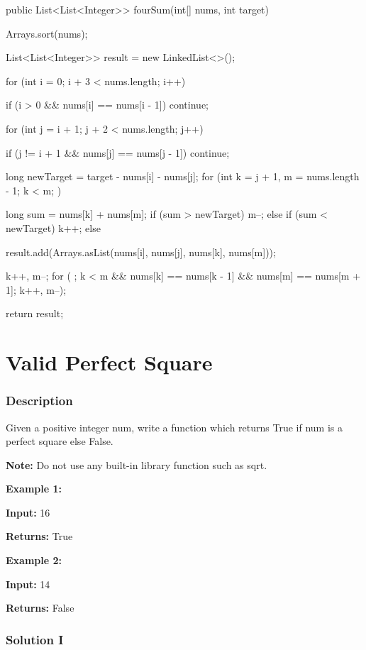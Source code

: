 \begin{Code}
public List<List<Integer>> fourSum(int[] nums, int target) {
    Arrays.sort(nums);

    List<List<Integer>> result = new LinkedList<>();

    for (int i = 0; i + 3 < nums.length; i++) {
        if (i > 0 && nums[i] == nums[i - 1]) {
            continue;
        }

        for (int j = i + 1; j + 2 < nums.length; j++) {
            if (j != i + 1 && nums[j] == nums[j - 1]) {
                continue;
            }

            long newTarget = target - nums[i] - nums[j];
            for (int k = j + 1, m = nums.length - 1; k < m; ) {
                long sum = nums[k] + nums[m];
                if (sum > newTarget) {
                    m--;
                } else if (sum < newTarget) {
                    k++;
                } else {
                    result.add(Arrays.asList(nums[i], nums[j], nums[k], nums[m]));

                    k++, m--;
                    for ( ; k < m && nums[k] == nums[k - 1] && nums[m] == nums[m + 1]; k++, m--);
                }
            }
        }
    }

    return result;
}
\end{Code}

\newpage

\section{Valid Perfect Square} %

\subsubsection{Description}
Given a positive integer num, write a function which returns True if num is a perfect square else False.

\textbf{Note:} Do not use any built-in library function such as sqrt.

\textbf{Example 1:}

\textbf{Input:} 16

\textbf{Returns:} True

\textbf{Example 2:}

\textbf{Input:} 14

\textbf{Returns:} False
\subsubsection{Solution I}

